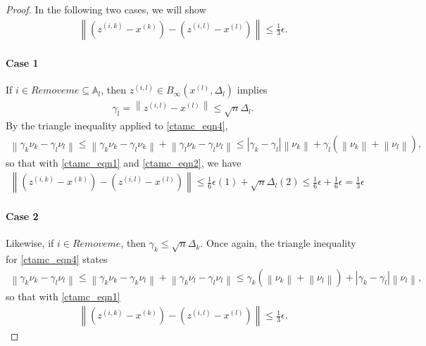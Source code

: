 \documentclass{article}
\theoremstyle{case}
\numberwithin{theorem}{subsection}
\newcommand{\activeconstraintsl}{{\mathbb A_{l}}}
\newcommand{\dk}{\Delta_k}
\newcommand{\dl}{\Delta_l}
\newcommand{\xk}{x^{(k)}}
\newcommand{\xl}{{x^{(l)}}}
\newcommand{\zik}{{z^{(i, k)}}}
\newcommand{\zil}{{z^{(i, l)}}}
\newcommand{\activeprojk}{{Remove me}}
\newcommand{\activeprojl}{{Remove me}}
\begin{document}
\begin{proof}
In the following two cases, we will show
\begin{align*}
\left\|\left(\zik - \xk\right) - \left(\zil - \xl\right)\right\| \le \frac 1 3 \epsilon.
\end{align*}
\paragraph{Case 1}
If $i \in \activeprojl \subseteq \activeconstraintsl$, then $\zil \in B_{\infty}\left(\xl, \dl\right)$ implies
\begin{align}
\gamma_l = \left\|\zil - \xl\right\| \le \sqrt{n}\dl. \label{ctamc_eqn2}
\end{align}
By the triangle inequality applied to \cref{ctamc_eqn4},
\begin{align*}
\left\|\gamma_k \nu_k - \gamma_l \nu_l \right\| 
\le \left\|\gamma_k \nu_k - \gamma_l \nu_k \right\| + \left\| \gamma_l \nu_k - \gamma_l \nu_l \right\| 
\le \left|\gamma_k - \gamma_l\right|\left\|\nu_k\right\| + \gamma_l \left(\left\|\nu_k\right\| + \left\|\nu_l \right\|\right),
\end{align*}
so that with \cref{ctamc_eqn1} and \cref{ctamc_eqn2}, we have
\begin{align*}
\left\|\left(\zik - \xk\right) - \left(\zil - \xl\right)\right\|
\le \frac 1 6 \epsilon (1) + \sqrt{n} \dl (2)
\le \frac 1 6 \epsilon + \frac 1 6 \epsilon = \frac 1 3 \epsilon
\end{align*}
\paragraph{Case 2}
Likewise, if $i \in \activeprojk$, then $\gamma_k \le \sqrt{n}\dk$.
Once again, the triangle inequality for \cref{ctamc_eqn4} states
\begin{align*}
\left\|\gamma_k \nu_k - \gamma_l \nu_l \right\| 
\le \left\|\gamma_k \nu_k - \gamma_k \nu_l \right\| + \left\| \gamma_k \nu_l - \gamma_l \nu_l \right\| 
\le \gamma_k \left(\left\|\nu_k\right\| + \left\|\nu_l \right\|\right) + \left|\gamma_k - \gamma_l\right|\left\|\nu_l\right\|,
\end{align*}
so that with \cref{ctamc_eqn1}
\begin{align*}
\left\|\left(\zik - \xk\right) - \left(\zil - \xl\right)\right\| \le \frac 1 3 \epsilon.
\end{align*}


\end{proof}
\end{document}
